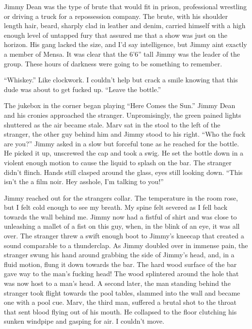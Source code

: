 Jimmy Dean was the type of brute that would fit in prison,
professional wrestling or driving a truck for a repossession
company. The brute, with his shoulder length hair, beard, sharply
clad in leather and denim, carried himself with a high enough level
of untapped fury that assured me that a show was just on the
horizon. His gang lacked the size, and I'd say intelligence,
but Jimmy aint exactly a member of Mensa. It was clear that the
6'6'' tall Jimmy was the leader of the group. These
hours of darkness were going to be something to remember.



``Whiskey.'' Like clockwork. I couldn't help but
crack a smile knowing that this dude was about to get fucked up.
``Leave the bottle.''



The jukebox in the corner began playing ``Here Comes the
Sun.'' Jimmy Dean and his cronies approached the stran\-ger.
Unpromisingly, the green pained lights shuttered as the air became
stale. Marv sat in the stool to the left of the stranger, the other
guy behind him and Jimmy stood to his right. ``Who the fuck
are you?'' Jimmy asked in a slow but forceful tone as he
reached for the bottle. He picked it up, unscrewed the cap and took
a swig. He set the bottle down in a violent enough motion to cause
the liquid to splash on the bar. The stranger didn't flinch.
Hands still clasped around the glass, eyes still looking down.
``This isn't the a film noir. Hey asshole, I'm
talking to you!''



Jimmy reached out for the strangers collar. The temperature in the
room rose, but I felt cold enough to see my breath. My spine felt
severed as I fell back towards the wall behind me. Jimmy now had a
fistful of shirt and was close to unleashing a mallet of a fist on
this guy, when, in the blink of an eye, it was all over. The
stranger threw a swift enough boot to Jimmy's kneecap that
created a sound comparable to a thunderclap. As Jimmy doubled over
in immense pain, the stranger swung his hand around grabbing the
side of Jimmy's head, and, in a fluid motion, flung it down
towards the bar. The hard wood surface of the bar gave way to the
man's fucking head! The wood splintered around the hole that
was now host to a man's head. A second later, the man
standing behind the stranger took flight towards the pool tables,
slammed into the wall and became one with a pool cue. Marv, the
third man, suffered a brutal shot to the throat that sent blood
flying out of his mouth. He collapsed to the floor clutching his
sunken windpipe and gasping for air. I couldn't move.



